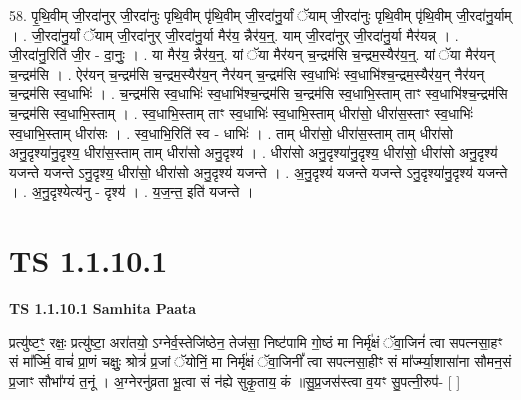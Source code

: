 \documentclass[17pt]{extarticle}
\begin{document}
58. पृ॒थि॒वीम् जी॒रदा॑नुर् जी॒रदा॑नुः पृथि॒वीम् पृ॑थि॒वीम् जी॒रदा॑नु॒र्यां ॅयाम् जी॒रदा॑नुः पृथि॒वीम् पृ॑थि॒वीम् जी॒रदा॑नु॒र्याम् । . जी॒रदा॑नु॒र्यां ॅयाम् जी॒रदा॑नुर् जी॒रदा॑नु॒र्या मैर॑य॒ न्नैर॑य॒न्॒. याम् जी॒रदा॑नुर् जी॒रदा॑नु॒र्या मैर॑यन्न् । . जी॒रदा॑नु॒रिति॑ जी॒र - दा॒नुः॒ । . या मैर॑य॒ न्नैर॑य॒न्॒. यां ॅया मैर॑यन् च॒न्द्रम॑सि च॒न्द्रम॒स्यैर॑य॒न्॒. यां ॅया मैर॑यन् च॒न्द्रम॑सि । . ऐर॑यन् च॒न्द्रम॑सि च॒न्द्रम॒स्यैर॑य॒न् नैर॑यन् च॒न्द्रम॑सि स्व॒धाभिः॑ स्व॒धाभि॑श्च॒न्द्रम॒स्यैर॑य॒न् नैर॑यन् च॒न्द्रम॑सि स्व॒धाभिः॑ । . च॒न्द्रम॑सि स्व॒धाभिः॑ स्व॒धाभि॑श्च॒न्द्रम॑सि च॒न्द्रम॑सि स्व॒धाभि॒स्ताम् ताꣳ स्व॒धाभि॑श्च॒न्द्रम॑सि च॒न्द्रम॑सि स्व॒धाभि॒स्ताम् । . स्व॒धाभि॒स्ताम् ताꣳ स्व॒धाभिः॑ स्व॒धाभि॒स्ताम् धीरा॑सो॒ धीरा॑स॒स्ताꣳ स्व॒धाभिः॑ स्व॒धाभि॒स्ताम् धीरा॑सः । . स्व॒धाभि॒रिति॑ स्व - धाभिः॑ । . ताम् धीरा॑सो॒ धीरा॑स॒स्ताम् ताम् धीरा॑सो अनु॒दृश्या॑नु॒दृश्य॒ धीरा॑स॒स्ताम् ताम् धीरा॑सो अनु॒दृश्य॑ । . धीरा॑सो अनु॒दृश्या॑नु॒दृश्य॒ धीरा॑सो॒ धीरा॑सो अनु॒दृश्य॑ यजन्ते यजन्ते ऽनु॒दृश्य॒ धीरा॑सो॒ धीरा॑सो अनु॒दृश्य॑ यजन्ते । . अ॒नु॒दृश्य॑ यजन्ते यजन्ते ऽनु॒दृश्या॑नु॒दृश्य॑ यजन्ते । . अ॒नु॒दृश्येत्य॑नु - दृश्य॑ । . य॒ज॒न्त॒ इति॑ यजन्ते । \newline
\pagebreak
{}
\section*{ TS 1.1.10.1 }

\textbf{TS 1.1.10.1 } \newline
\textbf{Samhita Paata} \newline

प्रत्यु॑ष्टꣳ॒॒ रक्षः॒ प्रत्यु॑ष्टा॒ अरा॑तयो॒ ऽग्नेर्व॒स्तेजि॑ष्ठेन॒ तेज॑सा॒ निष्ट॑पामि गो॒ष्ठं मा निर्मृ॑क्षं ॅवा॒जिनं॑ त्वा सपत्नसा॒हꣳ सं मा᳚र्ज्मि॒ वाचं॑ प्रा॒णं चक्षुः॒ श्रोत्रं॑ प्र॒जां ॅयोनिं॒ मा निर्मृ॑क्षं ॅवा॒जिनीं᳚ त्वा सपत्नसा॒हीꣳ सं मा᳚र्ज्म्या॒शासा॑ना सौमन॒सं प्र॒जाꣳ सौभा᳚ग्यं त॒नूं । अ॒ग्नेरनु॑व्रता भू॒त्वा सं न॑ह्ये सुकृ॒ताय॒ कं ॥सु॒प्र॒जस॑स्त्वा व॒यꣳ सु॒पत्नी॒रुप॑- [ ] \newline
\end{document}
